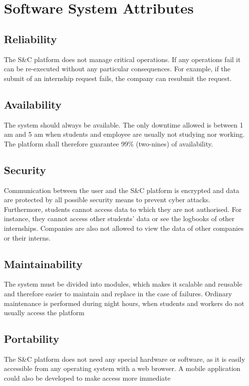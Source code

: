 \section{Software System Attributes}
\subsection{Reliability}
The S\&C platform does not manage critical operations. If any operations fail it can be re-executed without any particular consequences. For example, if the submit of an internship request fails, the company can resubmit the request.
\subsection{Availability}
The system should always be available. The only downtime allowed is between 1 am and 5 am when students and employee are usually not studying nor working. The platform shall therefore guarantee 99\% (two-nines) of availability.
\subsection{Security}
Communication between the user and the S\&C platform is encrypted and data are protected by all possible security means to prevent cyber attacks. Furthermore, students cannot access data to which they are not authorised. For instance, they cannot access other students' data or see the logbooks of other internships. Companies are also not allowed to view the data of other companies or their interns.
\subsection{Maintainability}
The system must be divided into modules, which makes it scalable and reusable and therefore easier to maintain and replace in the case of failures. Ordinary maintenance is performed during night hours, when students and workers do not usually access the platform
\subsection{Portability}
The S\&C platform does not need any special hardware or software, as it is easily accessible from any operating system with a web browser. A mobile application could also be developed to make access more immediate